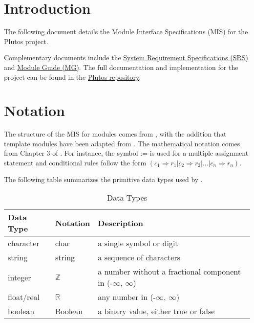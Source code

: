 \documentclass[12pt, titlepage]{article}
\begin{document}
\newpage

\tableofcontents

\newpage


\section{Introduction}

The following document details the Module Interface Specifications (MIS) for the
Plutos project.

Complementary documents include the
\href{https://github.com/PlutosCapstone/Plutos/blob/main/docs/SRS/SRS.pdf}{System
Requirement Specifications (SRS)} and
\href{https://github.com/PlutosCapstone/Plutos/blob/main/docs/Design/SoftArchitecture/MG.pdf}{Module
Guide (MG)}. The full documentation and implementation for the project can be
found in the \href{https://github.com/PlutosCapstone/Plutos/tree/main}{Plutos
repository}.

\section{Notation}

The structure of the MIS for modules comes from \citet{HoffmanAndStrooper1995},
with the addition that template modules have been adapted from
\cite{GhezziEtAl2003}.  The mathematical notation comes from Chapter 3 of
\citet{HoffmanAndStrooper1995}.  For instance, the symbol := is used for a
multiple assignment statement and conditional rules follow the form $(c_1
\Rightarrow r_1 | c_2 \Rightarrow r_2 | ... | c_n \Rightarrow r_n )$.

The following table summarizes the primitive data types used by \progname. 

\renewcommand{\arraystretch}{1.2}
\begin{table}[H]
\caption{Data Types}
\centering
\noindent 
\begin{tabular}{l l p{7.5cm}} 
\toprule 
\textbf{Data Type} & \textbf{Notation} & \textbf{Description}\\ 
\midrule
character & char & a single symbol or digit\\
string & string & a sequence of characters\\
integer & $\mathbb{Z}$ & a number without a fractional component in (-$\infty$, $\infty$) \\
float/real & $\mathbb{R}$ & any number in (-$\infty$, $\infty$)\\
boolean & Boolean & a binary value, either true or false\\
\bottomrule
\end{tabular} 
\end{table}
\end{document}
